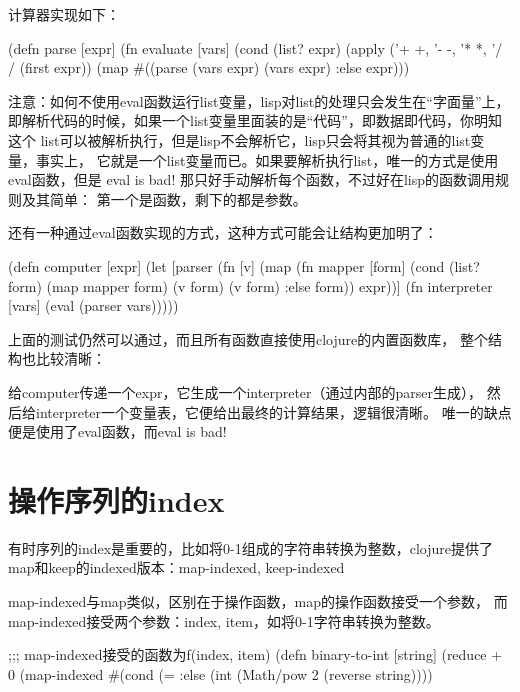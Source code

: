 ﻿\documentclass[a4paper,11pt]{article}
\begin{document}
  计算器实现如下：\par
  \begin{schemecode}
(defn parse
  [expr]
  (fn evaluate
    [vars]
    (cond
     (list? expr) (apply ({'+ +, '- -, '* *, '/ /} (first expr))
                         (map #((parse %
     (vars expr) (vars expr)
     :else expr)))
  \end{schemecode}

  注意：如何不使用eval函数运行list变量，lisp对list的处理只会发生在“字面量”上，
  即解析代码的时候，如果一个list变量里面装的是“代码”，即数据即代码，你明知这个
  list可以被解析执行，但是lisp不会解析它，lisp只会将其视为普通的list变量，事实上，
  它就是一个list变量而已。如果要解析执行list，唯一的方式是使用eval函数，但是
  eval is bad! 那只好手动解析每个函数，不过好在lisp的函数调用规则及其简单：
  第一个是函数，剩下的都是参数。
  
  还有一种通过eval函数实现的方式，这种方式可能会让结构更加明了：

  \begin{schemecode}
(defn computer
  [expr]
  (let [parser (fn [v]
                 (map (fn mapper [form]
                        (cond
                         (list? form) (map mapper form)
                         (v form) (v form)
                         :else form))
                      expr))]
    (fn interpreter [vars]
      (eval (parser vars)))))
  \end{schemecode}

  上面的测试仍然可以通过，而且所有函数直接使用clojure的内置函数库，
  整个结构也比较清晰：\par
  给computer传递一个expr，它生成一个interpreter（通过内部的parser生成），
  然后给interpreter一个变量表，它便给出最终的计算结果，逻辑很清晰。
  唯一的缺点便是使用了eval函数，而eval is bad!


  \section[操作序列的index]{操作序列的index}
  有时序列的index是重要的，比如将0-1组成的字符串转换为整数，clojure提供了
  map和keep的indexed版本：map-indexed, keep-indexed\par
  map-indexed与map类似，区别在于操作函数，map的操作函数接受一个参数，
  而map-indexed接受两个参数：index, item，如将0-1字符串转换为整数。

  \begin{schemecode}
;;; map-indexed接受的函数为f(index, item)
(defn binary-to-int
  [string]
  (reduce + 0
          (map-indexed #(cond
                         (= %
                         :else (int (Math/pow 2 %
                       (reverse string))))
  \end{schemecode}
\end{document}

